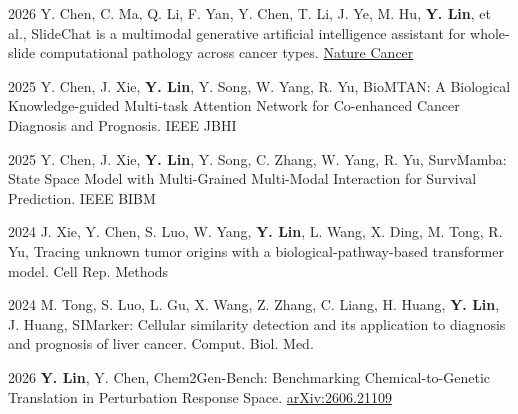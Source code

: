 \begin{cvhonors}
  \cvpub
    {2026}
    {Y. Chen, C. Ma, Q. Li, F. Yan, Y. Chen, T. Li, J. Ye, M. Hu, \textbf{Y. Lin}, et al., SlideChat is a multimodal generative artificial intelligence assistant for whole-slide computational pathology across cancer types.}
    {\href{https://doi.org/10.1038/s43018-026-01220-4}{Nature Cancer}}

  \cvpub
    {2025}
    {Y. Chen, J. Xie, \textbf{Y. Lin}, Y. Song, W. Yang, R. Yu, BioMTAN: A Biological Knowledge-guided Multi-task Attention Network for Co-enhanced Cancer Diagnosis and Prognosis.}
    {IEEE JBHI}

  \cvpub
    {2025}
    {Y. Chen, J. Xie, \textbf{Y. Lin}, Y. Song, C. Zhang, W. Yang, R. Yu, SurvMamba: State Space Model with Multi-Grained Multi-Modal Interaction for Survival Prediction.}
    {IEEE BIBM}

  \cvpub
    {2024}
    {J. Xie, Y. Chen, S. Luo, W. Yang, \textbf{Y. Lin}, L. Wang, X. Ding, M. Tong, R. Yu, Tracing unknown tumor origins with a biological-pathway-based transformer model.}
    {Cell Rep. Methods}

  \cvpub
    {2024}
    {M. Tong, S. Luo, L. Gu, X. Wang, Z. Zhang, C. Liang, H. Huang, \textbf{Y. Lin}, J. Huang, SIMarker: Cellular similarity detection and its application to diagnosis and prognosis of liver cancer.}
    {Comput. Biol. Med.}
\end{cvhonors}

\begin{cvhonors}
  \cvpub
    {2026}
    {\textbf{Y. Lin}, Y. Chen, Chem2Gen-Bench: Benchmarking Chemical-to-Genetic Translation in Perturbation Response Space.}
    {\href{https://arxiv.org/abs/2606.21109}{arXiv:2606.21109}}
\end{cvhonors}
